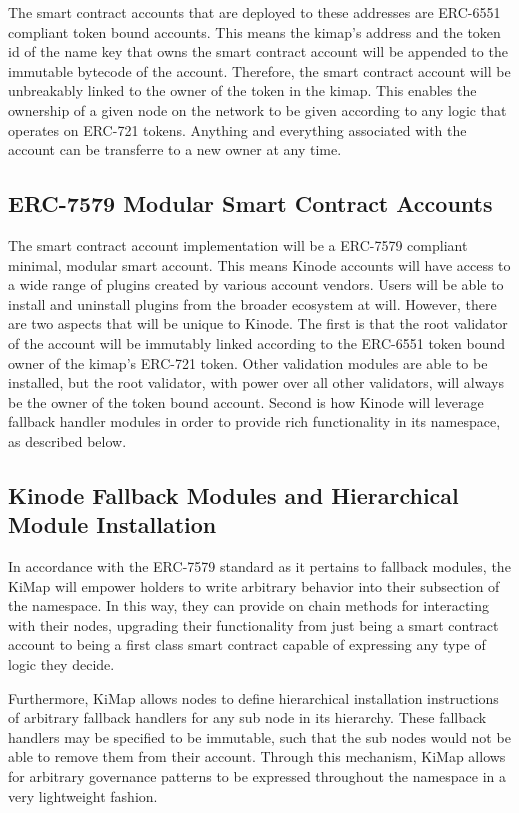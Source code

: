 \documentclass[runningheads]{llncs}
\begin{document}
The smart contract accounts that are deployed to these addresses are ERC-6551 compliant token bound accounts.
This means the kimap's address and the token id of the name key that owns the smart contract account will be appended to the immutable bytecode of the account.
Therefore, the smart contract account will be unbreakably linked to the owner of the token in the kimap.
This enables the ownership of a given node on the network to be given according to any logic that operates on ERC-721 tokens.
Anything and everything associated with the account can be transferre to a new owner at any time.

\subsection{ERC-7579 Modular Smart Contract Accounts}

The smart contract account implementation will be a ERC-7579 compliant minimal, modular smart account.
This means Kinode accounts will have access to a wide range of plugins created by various account vendors.
Users will be able to install and uninstall plugins from the broader ecosystem at will.
However, there are two aspects that will be unique to Kinode. The first is that the root validator of the account
will be immutably linked according to the ERC-6551 token bound owner of the kimap's ERC-721 token.
Other validation modules are able to be installed, but the root validator, with power over all other validators,
will always be the owner of the token bound account.
Second is how Kinode will leverage fallback handler modules in order to provide rich functionality in its namespace,
as described below.

\subsection{Kinode Fallback Modules and Hierarchical Module Installation}

In accordance with the ERC-7579 standard as it pertains to fallback modules, the KiMap will empower holders
to write arbitrary behavior into their subsection of the namespace.
In this way, they can provide on chain methods for interacting with their nodes, upgrading their functionality
from just being a smart contract account to being a first class smart contract capable of expressing any type of
logic they decide.

Furthermore, KiMap allows nodes to define hierarchical installation instructions of arbitrary fallback handlers
for any sub node in its hierarchy. These fallback handlers may be specified to be immutable, such that the
sub nodes would not be able to remove them from their account. Through this mechanism, KiMap allows for
arbitrary governance patterns to be expressed throughout the namespace in a very lightweight fashion.
\end{document}
